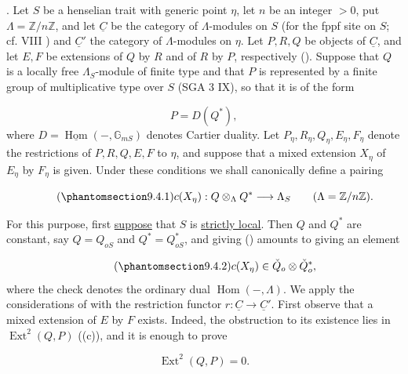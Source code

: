 
\medskip
\noindent
{}. Let $S$ be a henselian trait with generic point $\eta$, let $n$ be an
integer $>0$, put $\Lambda=\mathbb Z/n\mathbb Z$, and let $\underline C$ be
the category of $\Lambda$-modules on $S$ (for the fppf site on $S$; cf.
VIII ) and $\underline C'$ the category of $\Lambda$-modules on $\eta$.
Let $P,R,Q$ be objects of $\underline C$, and let $E,F$ be extensions of
$Q$ by $R$ and of $R$ by $P$, respectively (). Suppose that $Q$ is a
locally free $\Lambda_S$-module of finite type and that $P$ is represented
by a finite group of multiplicative type over $S$ (SGA 3 IX), so that it is
of the form

\begin{equation*}
P=D(Q^*),
\end{equation*}
where $D=\underline{\operatorname{Hom}}(-,\mathbb G_{mS})$ denotes Cartier
duality. Let $P_\eta,R_\eta,Q_\eta,E_\eta,F_\eta$ denote the restrictions of
$P,R,Q,E,F$ to $\eta$, and suppose that a mixed extension $X_\eta$ of
$E_\eta$ by $F_\eta$ is given. Under these conditions we shall canonically
define a pairing

\begin{equation}\tag{\SGARefTarget{sga7.sga7i.eix.n9-4-1}{9.4.1}}
c(X_\eta):Q\otimes_\Lambda Q^*\longrightarrow\Lambda_S
\qquad(\Lambda=\mathbb Z/n\mathbb Z).
\end{equation}

For this purpose, first \underline{suppose} that $S$ is \underline{strictly local}. Then $Q$
and $Q^*$ are constant, say $Q=Q_{oS}$ and $Q^*=Q^*_{oS}$, and giving
() amounts to giving an element

\begin{equation}\tag{\SGARefTarget{sga7.sga7i.eix.n9-4-2}{9.4.2}}
c(X_\eta)\in\check Q_o\otimes\check Q_o^*,
\end{equation}
where the check denotes the ordinary dual $\operatorname{Hom}(-,\Lambda)$.
We apply the considerations of  with the restriction functor
$r:\underline C\longrightarrow\underline C'$. First observe that a mixed
extension of $E$ by $F$ exists. Indeed, the obstruction to its existence
lies in $\operatorname{Ext}^2(Q,P)$ ((c)), and it is enough to prove

\begin{equation*}
\operatorname{Ext}^2(Q,P)=0.
\end{equation*}

